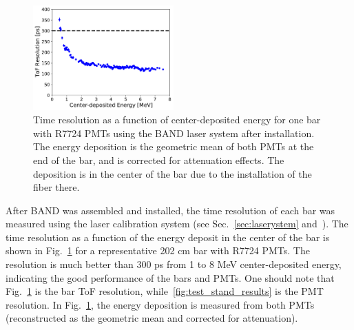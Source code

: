 \documentclass[review,number,sort&compress]{elsarticle}
\begin{document}
\begin{figure}[tb]
	\centering
		\includegraphics[width=0.48\textwidth]{fig7-laser-response.pdf}
		\caption{Time resolution as a function of center-deposited energy for one bar with R7724 PMTs using the
                  BAND laser system after installation. The energy deposition is the geometric mean of both PMTs at the
                  end of the bar, and is corrected for attenuation effects. The deposition is in the center of the bar due to the installation of the fiber there.}
         \label{fig:resolution-laser}
\end{figure}

After BAND was assembled and installed, the time resolution of each bar was measured using the laser calibration system (see Sec.~\ref{sec:laserystem} and~\cite{band-laser}). The time resolution as a function of the energy deposit in the center of the bar
is shown in Fig.~\ref{fig:resolution-laser} for a representative 202 \si{\centi\meter} bar 
with R7724 PMTs. The resolution is much better than 300
\si{\pico\s} from 1 to 8 \si{\mega\electronvolt} center-deposited energy, 
indicating the good performance of the bars and PMTs. One should note that 
Fig.~\ref{fig:resolution-laser} is the bar ToF resolution, while~\ref{fig:test_stand_results} is the PMT resolution. In Fig.~\ref{fig:resolution-laser}, the energy deposition is measured from both PMTs (reconstructed as the 
geometric mean and corrected for attenuation). 
\end{document}
